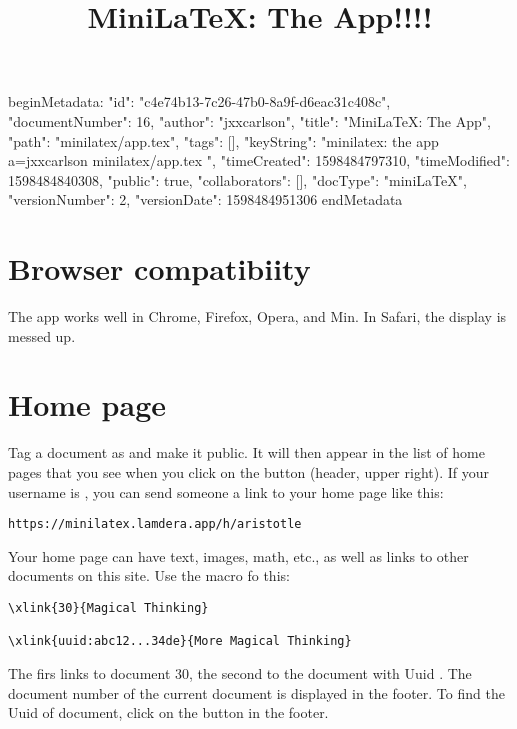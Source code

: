 beginMetadata:
{
    "id": "c4e74b13-7c26-47b0-8a9f-d6eac31c408c",
    "documentNumber": 16,
    "author": "jxxcarlson",
    "title": "MiniLaTeX: The App",
    "path": "minilatex/app.tex",
    "tags": [],
    "keyString": "minilatex: the app a=jxxcarlson minilatex/app.tex ",
    "timeCreated": 1598484797310,
    "timeModified": 1598484840308,
    "public": true,
    "collaborators": [],
    "docType": "miniLaTeX",
    "versionNumber": 2,
    "versionDate": 1598484951306
}
endMetadata
\title{MiniLaTeX: The App!!!!}

\maketitle

\tableofcontents


\section{Browser compatibiity}

The app works well in Chrome, Firefox, Opera, and Min.   In Safari, the display is messed up.

\section{Home page}

Tag a document as   and make it public.  It will then appear in the list of home pages that you see when you click on the button  (header, upper right).  If your username is , you can send someone a link to your home page like this:

\begin{verbatim}
https://minilatex.lamdera.app/h/aristotle
\end{verbatim}

Your home page can have text, images, math, etc., as well as links to other documents on this site.  Use the  macro fo this:

\begin{verbatim}
\xlink{30}{Magical Thinking}

\xlink{uuid:abc12...34de}{More Magical Thinking}
\end{verbatim}

The firs links to document 30, the second to the document with Uuid .  The document number of the current document is displayed in the footer.  To find the Uuid of  document, click on the button  in the footer. 

